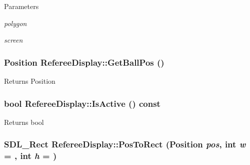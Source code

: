 \begin{DoxyParams}{Parameters}
\item[{\em polygon}]\item[{\em screen}]\end{DoxyParams}
\hypertarget{classRefereeDisplay_afa7601bcd5b6361398f48f2fb1d6ead4}{
\subsubsection[{GetBallPos}]{\setlength{\rightskip}{0pt plus 5cm}Position RefereeDisplay::GetBallPos ()}}
\label{classRefereeDisplay_afa7601bcd5b6361398f48f2fb1d6ead4}
\begin{DoxyReturn}{Returns}
Position 
\end{DoxyReturn}
\hypertarget{classRefereeDisplay_a216bbade42b7c7694f69d73c35620fc6}{
\subsubsection[{IsActive}]{\setlength{\rightskip}{0pt plus 5cm}bool RefereeDisplay::IsActive () const}}
\label{classRefereeDisplay_a216bbade42b7c7694f69d73c35620fc6}
\begin{DoxyReturn}{Returns}
bool 
\end{DoxyReturn}
\hypertarget{classRefereeDisplay_a56d7e17a5fb16cbe64fb7ef3e4f28af0}{
\subsubsection[{PosToRect}]{\setlength{\rightskip}{0pt plus 5cm}SDL\_\-Rect RefereeDisplay::PosToRect (Position {\em pos}, \/  int {\em w} = {}, \/  int {\em h} = {})}}
\label{classRefereeDisplay_a56d7e17a5fb16cbe64fb7ef3e4f28af0}

